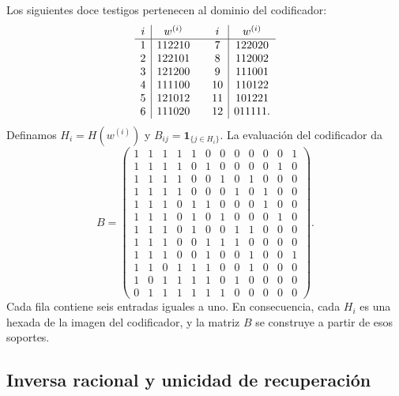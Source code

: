 Los siguientes doce testigos pertenecen al dominio del codificador:
\[
\begin{array}{c|c@{\qquad}c|c}
i&w^{(i)}&i&w^{(i)}\\\hline
1&112210&7&122020\\
2&122101&8&112002\\
3&121200&9&111001\\
4&111100&10&110122\\
5&121012&11&101221\\
6&111020&12&011111.
\end{array}
\]
Definamos $H_i=H(w^{(i)})$ y
$B_{ij}=\mathbf1_{\{j\in H_i\}}$. La evaluación del codificador da
\begingroup\small\setlength{\arraycolsep}{3pt}
\setcounter{MaxMatrixCols}{12}
\begin{equation}
B=\begin{pmatrix}
1&1&1&1&1&0&0&0&0&0&0&1\\
1&1&1&1&0&1&0&0&0&0&1&0\\
1&1&1&1&0&0&1&0&1&0&0&0\\
1&1&1&1&0&0&0&1&0&1&0&0\\
1&1&1&0&1&1&0&0&0&1&0&0\\
1&1&1&0&1&0&1&0&0&0&1&0\\
1&1&1&0&1&0&0&1&1&0&0&0\\
1&1&1&0&0&1&1&1&0&0&0&0\\
1&1&1&0&0&1&0&0&1&0&0&1\\
1&1&0&1&1&1&0&0&1&0&0&0\\
1&0&1&1&1&1&0&1&0&0&0&0\\
0&1&1&1&1&1&1&0&0&0&0&0
\end{pmatrix}.
\label{rh:eq:incidencia}
\end{equation}
\endgroup
Cada fila contiene seis entradas iguales a uno. En consecuencia, cada
$H_i$ es una hexada de la imagen del codificador, y la matriz $B$ se
construye a partir de esos soportes.

\subsection{Inversa racional y unicidad de recuperación}

